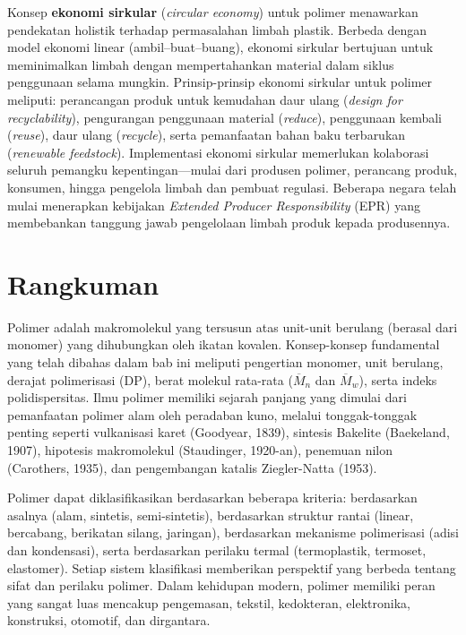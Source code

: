 \documentclass[12pt,a4paper,openany]{book}
\begin{document}
Konsep \textbf{ekonomi sirkular} (\textit{circular economy}) untuk polimer menawarkan pendekatan holistik terhadap permasalahan limbah plastik. Berbeda dengan model ekonomi linear (ambil--buat--buang), ekonomi sirkular bertujuan untuk meminimalkan limbah dengan mempertahankan material dalam siklus penggunaan selama mungkin. Prinsip-prinsip ekonomi sirkular untuk polimer meliputi: perancangan produk untuk kemudahan daur ulang (\textit{design for recyclability}), pengurangan penggunaan material (\textit{reduce}), penggunaan kembali (\textit{reuse}), daur ulang (\textit{recycle}), serta pemanfaatan bahan baku terbarukan (\textit{renewable feedstock}). Implementasi ekonomi sirkular memerlukan kolaborasi seluruh pemangku kepentingan---mulai dari produsen polimer, perancang produk, konsumen, hingga pengelola limbah dan pembuat regulasi. Beberapa negara telah mulai menerapkan kebijakan \textit{Extended Producer Responsibility} (EPR) yang membebankan tanggung jawab pengelolaan limbah produk kepada produsennya.


\section{Rangkuman}

Polimer adalah makromolekul yang tersusun atas unit-unit berulang (berasal dari monomer) yang dihubungkan oleh ikatan kovalen. Konsep-konsep fundamental yang telah dibahas dalam bab ini meliputi pengertian monomer, unit berulang, derajat polimerisasi (DP), berat molekul rata-rata ($\overline{M}_n$ dan $\overline{M}_w$), serta indeks polidispersitas. Ilmu polimer memiliki sejarah panjang yang dimulai dari pemanfaatan polimer alam oleh peradaban kuno, melalui tonggak-tonggak penting seperti vulkanisasi karet (Goodyear, 1839), sintesis Bakelite (Baekeland, 1907), hipotesis makromolekul (Staudinger, 1920-an), penemuan nilon (Carothers, 1935), dan pengembangan katalis Ziegler-Natta (1953).

Polimer dapat diklasifikasikan berdasarkan beberapa kriteria: berdasarkan asalnya (alam, sintetis, semi-sintetis), berdasarkan struktur rantai (linear, bercabang, berikatan silang, jaringan), berdasarkan mekanisme polimerisasi (adisi dan kondensasi), serta berdasarkan perilaku termal (termoplastik, termoset, elastomer). Setiap sistem klasifikasi memberikan perspektif yang berbeda tentang sifat dan perilaku polimer. Dalam kehidupan modern, polimer memiliki peran yang sangat luas mencakup pengemasan, tekstil, kedokteran, elektronika, konstruksi, otomotif, dan dirgantara.
\end{document}
